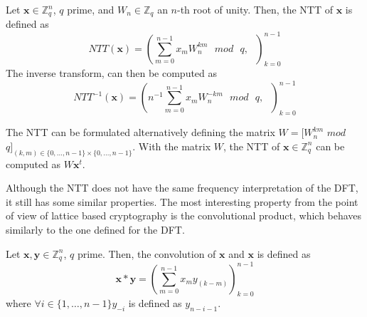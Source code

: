\begin{definition}[NTT]
Let $\mathbf{x}\in\mathbb{Z}_q^n$, $q$ prime, and $W_n\in\mathbb{Z}_q$ an $n$-th root of unity. Then, the NTT of $\mathbf{x}$ is defined as
\begin{equation*}
NTT(\mathbf{x})=\left(\sum_{m=0}^{n-1}x_mW_n^{km}\text{ }mod\text{ }q,\text{ }\right)_{k=0}^{n-1}  
\end{equation*}
The inverse transform, can then be computed as
\begin{equation*}
NTT^{-1}(\mathbf{x})=\left(n^{-1}\sum_{m=0}^{n-1}x_mW_n^{-km}\text{ }mod\text{ }q,\text{ }\right)_{k=0}^{n-1}
\end{equation*} 
\end{definition}

\begin{remark}
The NTT can be formulated alternatively defining the matrix $W=[W_n^{km}$ $mod$ $q]_{(k,m)\in\{0,\ldots,n-1\}\times\{0,\ldots,n-1\}}$. With the matrix $W$, the NTT of $\mathbf{x}\in\mathbb{Z}_q^n$ can be computed as $W\mathbf{x}^t$.
\end{remark}

Although the NTT does not have the same frequency interpretation of the DFT, it still has some similar properties. The most interesting property from the point of view of lattice based cryptography is the convolutional product, which behaves similarly to the one defined for the DFT.

\begin{definition}
Let $\mathbf{x},\mathbf{y}\in\mathbb{Z}_q^n$, $q$ prime. Then, the convolution of $\mathbf{x}$ and $\mathbf{x}$ is defined as
\begin{equation*}
\mathbf{x}\ast\mathbf{y} = \left(\sum_{m=0}^{n-1}x_{m}y_{(k-m)}\right)_{k=0}^{n-1}
\end{equation*}
where $\forall i \in \{1,\ldots,n-1\} y_{-i}$ is defined as $y_{n-i-1}$. 
\end{definition}

